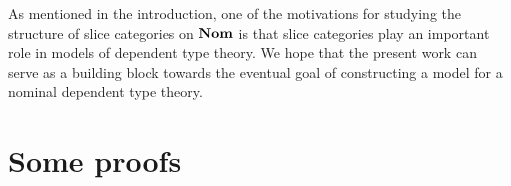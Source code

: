 \documentclass[11pt,a4paper]{amsart}
\theoremstyle{plain}
\theoremstyle{definition}
\theoremstyle{remark}
\newcommand{\Nom}{\textrm{\bf Nom}}
\begin{document}
As mentioned in the introduction, one of the motivations for studying
the structure of slice categories on $\Nom$ is that slice categories
play an important role in models of dependent type theory. We hope
that the present work can serve as a building block towards the
eventual goal of constructing a model for a nominal dependent type
theory. 




\appendix


\section{Some proofs}\label{app:proofs}
\end{document}

